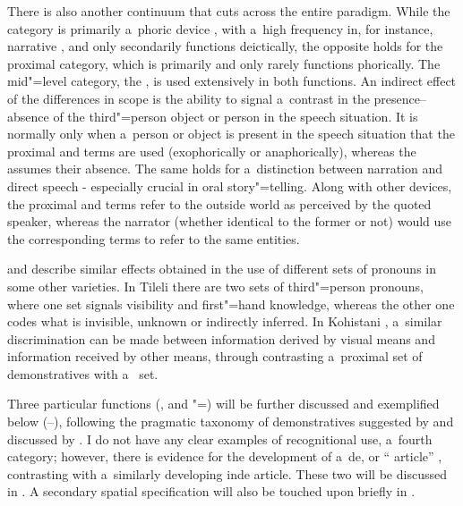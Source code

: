 There is also another continuum that cuts across the entire paradigm. While the  category is primarily a~phoric device \citep[131]{saxena2006}, with a~high frequency in, for instance, narrative , and only secondarily functions deictically, the opposite holds for the proximal category, which is primarily  and only rarely functions phorically. The mid"=level category, the , is used extensively in both functions. An indirect effect of the differences in  scope is the ability to signal a~contrast in the presence--absence of the third"=person object or person in the speech situation. It is normally only when a~person or object is present in the speech situation that the proximal and  terms are used (exophorically or anaphorically), whereas the  assumes their absence. The same holds for a~distinction between narration and direct speech - especially crucial in oral story"=telling. Along with other  devices, the proximal and  terms refer to the outside world as perceived by the quoted speaker, whereas the narrator (whether identical to the former or not) would use the corresponding  terms to refer to the same entities.



\citet[204--205, 207--212]{schmidt2000} and \citet[134--136]{schmidtkohistani2001} describe similar effects obtained in the use of different sets of pronouns in some other \iliShina varieties. In Tileli there are two sets of third"=person pronouns, where one set signals visibility and first"=hand knowledge, whereas the other one codes what is invisible, unknown or indirectly inferred. In Kohistani \iliShina, a~similar discrimination can be made between information derived by visual means and information received by other means, through contrasting a~proximal set of demonstratives with a~ set. 



Three particular functions (,  and "=) will be further discussed and exemplified below (--), following the pragmatic taxonomy of demonstratives suggested by \citet[205--254]{himmelmann1996} and discussed by \citet[432]{diessel2006}. I do not have any clear examples of recognitional use, a~fourth category; however, there is evidence for the development of a~de, or `` article'' \citep[486]{juvonen2006}, contrasting with a~similarly developing inde article. These two will be discussed in . A secondary spatial specification will also be touched upon briefly in .


